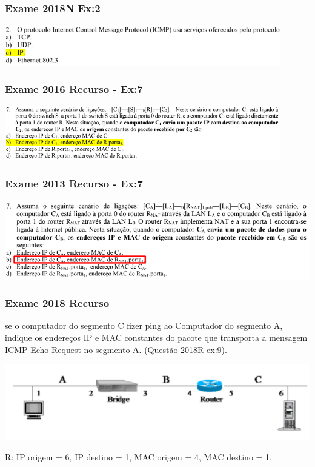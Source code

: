\documentclass[../resumosRCOM.tex]{subfiles}
\begin{document}
\subsubsection{Exame 2018N Ex:2}
\begin{center}
    \includegraphics[width=12cm]{images/RCOM44.png}
\end{center}

\subsubsection{Exame 2016 Recurso - Ex:7}
\begin{center}            
    \includegraphics[width=12cm]{images/RCOM50.png}
\end{center}
\subsubsection{Exame 2013 Recurso - Ex:7}
\begin{center}            
    \includegraphics[width=14cm]{images/RCOM53.png}
\end{center}

\subsubsection{Exame 2018 Recurso }
se o computador do segmento C fizer ping ao Computador 
do segmento A, indique os endereços IP e MAC constantes 
do pacote que transporta a mensagem ICMP Echo Request no 
segmento A. (Questão 2018R-ex:9).
\begin{center}
    \includegraphics[width=15cm]{images/RCOM49.png}
\end{center}
R: IP origem = 6, IP destino = 1, MAC origem = 4, MAC destino = 1.\newline
\end{document}

